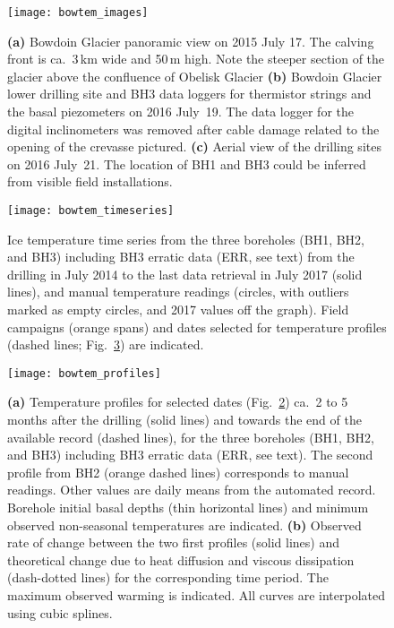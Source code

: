\documentclass[utf8]{article}
\begin{document}
    \begin{figure}
      \centerline{\texttt{[image: bowtem\_images]}}
      \caption{%
        \textbf{(a)} Bowdoin Glacier panoramic view on 2015 July 17. The
          calving front is ca.~3\,km wide and 50\,m high. Note the steeper
          section of the glacier above the confluence of Obelisk Glacier
        \textbf{(b)} Bowdoin Glacier lower drilling site and BH3 data loggers
          for thermistor strings and the basal piezometers on 2016 July~19. The
          data logger for the digital inclinometers was removed after cable
          damage related to the opening of the crevasse pictured.
        \textbf{(c)} Aerial view of the drilling sites on 2016 July~21. The
          location of BH1 and BH3 could be inferred from visible field
          installations.}
      \label{fig:images}
    \end{figure}

    \begin{figure}
      \centerline{\texttt{[image: bowtem\_timeseries]}}
      \caption{%
        Ice temperature time series from the three boreholes (BH1, BH2, and
        BH3) including BH3 erratic data (ERR, see text) from the drilling in
        July 2014 to the last data retrieval
        in July 2017 (solid lines), and manual temperature readings (circles,
        with outliers marked as empty circles, and 2017 values off the graph).
        Field campaigns (orange spans) and dates selected for
        temperature profiles (dashed lines; Fig.~\ref{fig:profiles}) are
        indicated.}
      \label{fig:timeseries}
    \end{figure}

    \begin{figure}
      \centerline{\texttt{[image: bowtem\_profiles]}}
      \caption{%
        \textbf{(a)} Temperature profiles for selected dates
          (Fig.~\ref{fig:timeseries}) ca.~2 to 5 months after the drilling
          (solid lines) and towards the end of the available record (dashed
          lines), for the three boreholes (BH1, BH2, and BH3) including BH3
          erratic data (ERR, see text). The second profile from BH2 (orange
          dashed lines) corresponds to manual readings. Other values are daily
          means from the automated record. Borehole initial basal depths (thin
          horizontal lines) and minimum observed non-seasonal temperatures are
          indicated.
        \textbf{(b)} Observed rate of change between the two first profiles
          (solid lines) and theoretical change due to heat diffusion and
          viscous dissipation (dash-dotted lines) for the corresponding time
          period. The maximum observed warming is indicated. All curves are
          interpolated using cubic splines.}
      \label{fig:profiles}
    \end{figure}
\end{document}
